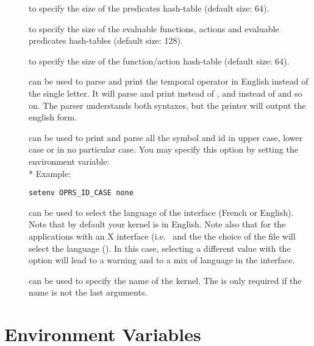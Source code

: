 \begin{description}
\item[] to specify the size of the predicates hash-table
(default size: 64).

\item[] to specify the size of the evaluable functions, actions and
evaluable predicates hash-tables (default size: 128).

\item[] to specify the size of the function/action hash-table
(default size: 64).

\item[] can be used to parse and print the temporal operator in English
instead of the single letter. It will parse and print  instead of \samp{!},
and  instead of \samp{\^{}} and so on.  The parser understands both syntaxes,
 but the printer will output the english form.

\item[] can be used to print and parse all the symbol
and id in upper case, lower case or in no particular case. You may specify this
option by setting the  environment variable:\\*
Example:
\begin{verbatim}
setenv OPRS_ID_CASE none
\end{verbatim}

\item[] can be used to select the language of the interface
(French or English). Note that by default your kernel is in English. Note also
that for the applications with an X interface (i.e.\ \XPK{} and the \OPE{} the
choice of the  file will select the language
(). In this case, selecting a
different value with the option will lead to a warning and to a mix of language
in the interface.

\item[] can be used to specify the name of the kernel. The 
is only required if the name is not the last arguments.

\end{description}

\section{\CPK{} Environment Variables}

